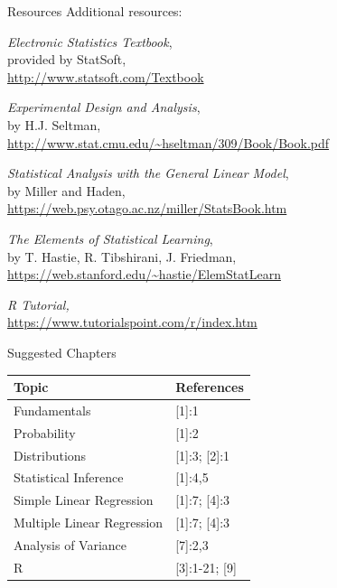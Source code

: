 \begin{frame}{Resources}
    Additional resources:
    \begin{enumerate}    
        \setcounter{enumi}{4}
        {\small
            
            \item \textit{Electronic Statistics Textbook},\\
            provided by StatSoft,\\
            \url{http://www.statsoft.com/Textbook}
            
            \item \textit{Experimental Design and Analysis},\\
            by H.J. Seltman,\\
            \url{http://www.stat.cmu.edu/~hseltman/309/Book/Book.pdf}
    
            \item \textit{Statistical Analysis with the General Linear Model},\\
            by Miller and Haden,\\
            \url{https://web.psy.otago.ac.nz/miller/StatsBook.htm}
                   
            \item \textit{The Elements of Statistical Learning},\\
            by T. Hastie, R. Tibshirani, J. Friedman,\\
            \url{https://web.stanford.edu/~hastie/ElemStatLearn}
            
            \item \textit{R Tutorial,}\\
            \url{https://www.tutorialspoint.com/r/index.htm} 
        }    
    \end{enumerate}
\end{frame}

\begin{frame}{Suggested Chapters}

    \begin{center}
    \begin{tabular}{l l}
        \hline
        Topic & References \\
        \hline
        Fundamentals                    & [1]:1 \\
        Probability                     & [1]:2 \\
        Distributions                   & [1]:3; [2]:1 \\
        Statistical Inference           & [1]:4,5 \\
        Simple Linear Regression        & [1]:7; [4]:3 \\
        Multiple Linear Regression      & [1]:7; [4]:3 \\
        Analysis of Variance            & [7]:2,3 \\
        R                               & [3]:1-21; [9]\\
    \end{tabular}
    \end{center}

\end{frame}

